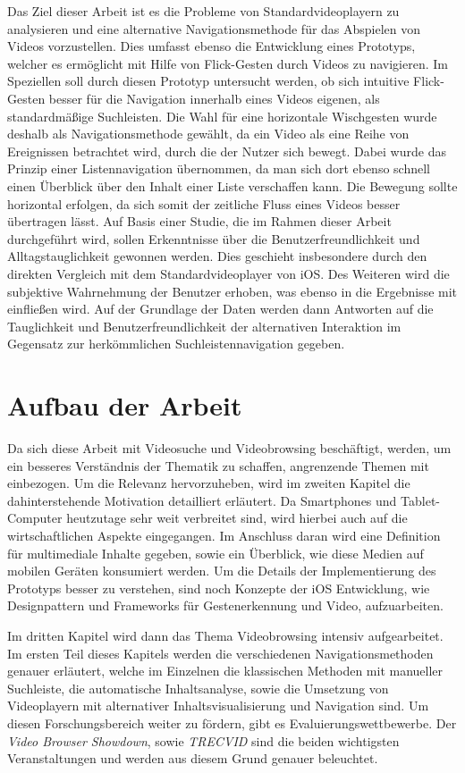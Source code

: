 \documentclass[11pt,a4paper]{report}
\begin{document}
Das Ziel dieser Arbeit ist es die Probleme von Standardvideoplayern zu analysieren und eine alternative Navigationsmethode für das Abspielen von Videos vorzustellen. Dies umfasst ebenso die Entwicklung eines Prototyps, welcher es ermöglicht mit Hilfe von Flick-Gesten durch Videos zu navigieren. Im Speziellen soll durch diesen Prototyp untersucht werden, ob sich intuitive Flick-Gesten besser für die Navigation innerhalb eines Videos eigenen, als standardmäßige Suchleisten. Die Wahl für eine horizontale Wischgesten wurde deshalb als Navigationsmethode gewählt, da ein Video als eine Reihe von Ereignissen betrachtet wird, durch die der Nutzer sich bewegt. Dabei wurde das Prinzip einer Listennavigation übernommen, da man sich dort ebenso schnell einen Überblick über den Inhalt einer Liste verschaffen kann. Die Bewegung sollte horizontal erfolgen, da sich somit der zeitliche Fluss eines Videos besser übertragen lässt. Auf Basis einer Studie, die im Rahmen dieser Arbeit durchgeführt wird, sollen Erkenntnisse über die Benutzerfreundlichkeit und Alltagstauglichkeit gewonnen werden. Dies geschieht insbesondere durch den direkten Vergleich mit dem Standardvideoplayer von iOS. Des Weiteren wird die subjektive Wahrnehmung der Benutzer erhoben, was ebenso in die Ergebnisse mit einfließen wird. Auf der Grundlage der Daten werden dann Antworten auf die Tauglichkeit und Benutzerfreundlichkeit der alternativen Interaktion im Gegensatz zur herkömmlichen Suchleistennavigation gegeben.

\section{Aufbau der Arbeit}

Da sich diese Arbeit mit Videosuche und Videobrowsing beschäftigt, werden, um ein besseres Verständnis der Thematik zu schaffen, angrenzende Themen mit einbezogen. Um die Relevanz hervorzuheben, wird im zweiten Kapitel die dahinterstehende Motivation detailliert erläutert. Da Smartphones und Tablet-Computer heutzutage sehr weit verbreitet sind, wird hierbei auch auf die wirtschaftlichen Aspekte eingegangen. Im Anschluss daran wird eine Definition für multimediale Inhalte gegeben, sowie ein Überblick, wie diese Medien auf mobilen Geräten konsumiert werden. Um die Details der Implementierung des Prototyps besser zu verstehen, sind noch Konzepte der iOS Entwicklung, wie Designpattern und Frameworks für Gestenerkennung und Video, aufzuarbeiten.

Im dritten Kapitel wird dann das Thema Videobrowsing intensiv aufgearbeitet. Im ersten Teil dieses Kapitels werden die verschiedenen Navigationsmethoden genauer erläutert, welche im Einzelnen die klassischen Methoden mit manueller Suchleiste, die automatische Inhaltsanalyse, sowie die Umsetzung von Videoplayern mit alternativer Inhaltsvisualisierung und Navigation sind. Um diesen Forschungsbereich weiter zu fördern, gibt es Evaluierungswettbewerbe. Der \emph{Video Browser Showdown}, sowie \emph{TRECVID} sind die beiden wichtigsten Veranstaltungen und werden aus diesem Grund genauer beleuchtet. 
\end{document}
